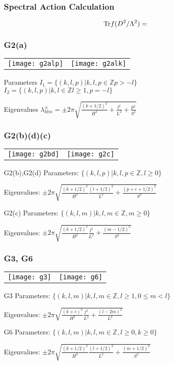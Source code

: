 \documentclass{beamer}
\def\Z{{\mathbb Z}}
\def\Tr{{\rm Tr}}
\begin{document}
\begin{frame}
	\frametitle{Spectral Action Calculation}
	\begin{block}{}
		\[
		\Tr f(D^2/\Lambda^2) =
		\]
	\end{block}
\end{frame}

\begin{frame}
	\frametitle{G2(a)}
		\begin{tabular}[]{lr}
\texttt{[image: g2alp]} & \texttt{[image: g2alk]}\\
		\end{tabular}

		\begin{block}{Parameters}
			$I_1 = \{(k,l,p)| k,l,p \in \Z p > -l \}$
			$I_2 = \{(k,l,p)| k,l \in \Z l \geq 1, p = -l \}$
		\end{block}
		\begin{block}{Eigenvalues}
			$\lambda_{klm}^{\pm} = \pm 2 \pi \sqrt{\frac{(k + 1/2)^2}{H^2} + \frac{l^2}{L^2} + \frac{p^2}{S^2}}$
		\end{block}
\end{frame}

\begin{frame}
	\frametitle{G2(b)(d)(c)}
		\begin{tabular}[]{lr}
\texttt{[image: g2bd]} & \texttt{[image: g2c]}\\
		\end{tabular}
		\begin{block}{G2(b),G2(d)}
			Parameters: $\{(k,l,p)| k,l,p \in \Z, l \geq 0\}$

			Eigenvalues: $\pm 2\pi\sqrt{\frac{(k+1/2)^2}{H^2}\frac{(l+1/2)^2}{L^2} + \frac{(p+c+1/2)^2}{S^2}}$
		\end{block}
		\begin{block}{G2(c)}
			Parameters: $\{(k,l,m)| k,l,m \in \Z, m \geq 0\}$

			Eigenvalues: $\pm 2\pi\sqrt{\frac{(k+1/2)^2}{H^2}\frac{l^2}{L^2} + \frac{(m-1/2)^2}{S^2}}$
		\end{block}
\end{frame}

\begin{frame}
	\frametitle{G3, G6}
		\begin{tabular}[]{lr}
\texttt{[image: g3]} & \texttt{[image: g6]}\\
		\end{tabular}
		\begin{block}{G3}
			Parameters: $\{(k,l,m)| k,l,m \in \Z, l \geq 1, 0 \leq m < l\}$

			Eigenvalues: $\pm 2\pi\sqrt{\frac{(k+c)^2}{H^2}\frac{l^2}{L^2} + \frac{(l - 2m)^2}{L^2}}$
		\end{block}
		\begin{block}{G6}
			Parameters: $\{(k,l,m)| k,l,m \in \Z, l \geq 0, k\geq 0\}$

			Eigenvalues: $\pm 2\pi\sqrt{\frac{(k+1/2)^2}{H^2}\frac{(l+1/2)^2}{L^2} + \frac{(m + 1/2)^2}{S^2}}$
		\end{block}
\end{frame}
\end{document}
